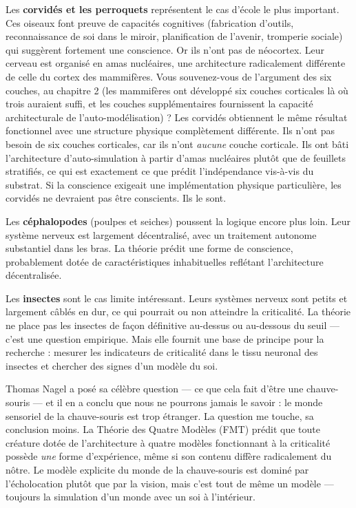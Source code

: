 \documentclass[11pt, twoside, openright]{book}
\begin{document}
Les \textbf{corvidés et les perroquets} représentent le cas d'école le plus important. Ces oiseaux font preuve de capacités cognitives (fabrication d'outils, reconnaissance de soi dans le miroir, planification de l'avenir, tromperie sociale) qui suggèrent fortement une conscience. Or ils n'ont pas de néocortex. Leur cerveau est organisé en amas nucléaires, une architecture radicalement différente de celle du cortex des mammifères. Vous souvenez-vous de l'argument des six couches, au chapitre 2 (les mammifères ont développé six couches corticales là où trois auraient suffi, et les couches supplémentaires fournissent la capacité architecturale de l'auto-modélisation) ? Les corvidés obtiennent le même résultat fonctionnel avec une structure physique complètement différente. Ils n'ont pas besoin de six couches corticales, car ils n'ont \textit{aucune} couche corticale. Ils ont bâti l'architecture d'auto-simulation à partir d'amas nucléaires plutôt que de feuillets stratifiés, ce qui est exactement ce que prédit l'indépendance vis-à-vis du substrat. Si la conscience exigeait une implémentation physique particulière, les corvidés ne devraient pas être conscients. Ils le sont.

Les \textbf{céphalopodes} (poulpes et seiches) poussent la logique encore plus loin. Leur système nerveux est largement décentralisé, avec un traitement autonome substantiel dans les bras. La théorie prédit une forme de conscience, probablement dotée de caractéristiques inhabituelles reflétant l'architecture décentralisée.

Les \textbf{insectes} sont le cas limite intéressant. Leurs systèmes nerveux sont petits et largement câblés en dur, ce qui pourrait ou non atteindre la criticalité. La théorie ne place pas les insectes de façon définitive au-dessus ou au-dessous du seuil --- c'est une question empirique. Mais elle fournit une base de principe pour la recherche : mesurer les indicateurs de criticalité dans le tissu neuronal des insectes et chercher des signes d'un modèle du soi.

Thomas Nagel a posé sa célèbre question --- ce que cela fait d'être une chauve-souris --- et il en a conclu que nous ne pourrons jamais le savoir : le monde sensoriel de la chauve-souris est trop étranger. La question me touche, sa conclusion moins. La Théorie des Quatre Modèles (FMT) prédit que toute créature dotée de l'architecture à quatre modèles fonctionnant à la criticalité possède \textit{une} forme d'expérience, même si son contenu diffère radicalement du nôtre. Le modèle explicite du monde de la chauve-souris est dominé par l'écholocation plutôt que par la vision, mais c'est tout de même un modèle --- toujours la simulation d'un monde avec un soi à l'intérieur.
\end{document}
